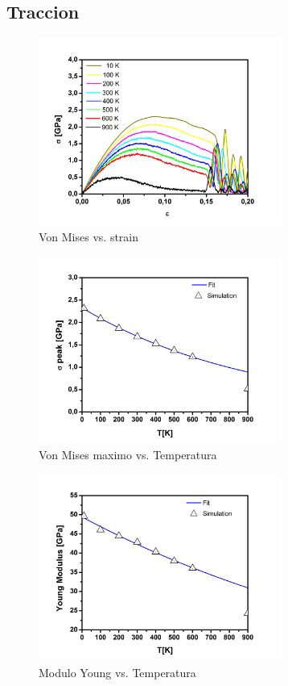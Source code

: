 \documentclass[10pt, oneside]{article} %
\begin{document}
\subsection{Traccion}

\begin{figure}[H]
\centering
\includegraphics[width=8cm]{stress_strain_TEN.png}
\caption{Von Mises vs. strain}
\end{figure}

\begin{figure}[H]
\centering
\includegraphics[width=8cm]{peakstress_T_TEN.png}
\caption{Von Mises maximo vs. Temperatura}
\end{figure}

\begin{figure}[H]
\centering
\includegraphics[width=8cm]{young_T_TEN.png}
\caption{Modulo Young vs. Temperatura}
\end{figure}
\end{document}
